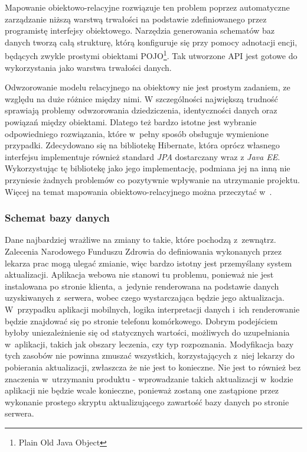\documentclass[11pt]{aghdpl}
\begin{document}
Mapowanie obiektowo-relacyjne rozwiązuje ten problem poprzez automatyczne zarządzanie niższą warstwą trwałości na podstawie zdefiniowanego przez programistę interfejsy obiektowego. Narzędzia generowania schematów baz danych tworzą całą strukturę, którą konfiguruje się przy pomocy adnotacji encji, będących zwykle prostymi obiektami POJO\footnote{Plain Old Java Object}. Tak utworzone API jest gotowe do wykorzystania jako warstwa trwałości danych.

Odwzorowanie modelu relacyjnego na obiektowy nie jest prostym zadaniem, ze względu na duże różnice między nimi. W szczególności największą trudność sprawiają problemy odwzorowania dziedziczenia, identyczności danych oraz powiązań między obiektami. Dlatego też bardzo istotne jest wybranie odpowiedniego rozwiązania, które w~pełny sposób obsługuje wymienione przypadki. Zdecydowano się na bibliotekę Hibernate, która oprócz własnego interfejsu implementuje również standard \emph{JPA} dostarczany wraz z \emph{Java EE}. Wykorzystując tę bibliotekę jako jego implementację, podmiana jej na inną nie przyniesie żadnych problemów co pozytywnie wpływanie na utrzymanie projektu. Więcej na temat mapowania obiektowo-relacyjnego można przeczytać w~\cite{HORM}.

\subsubsection{Schemat bazy danych}

Dane najbardziej wrażliwe na zmiany to takie, które pochodzą z~zewnątrz. Zalecenia Narodowego Funduszu Zdrowia do definiowania wykonanych przez lekarza prac mogą ulegać zmianie, więc bardzo istotny jest przemyślany system aktualizacji. Aplikacja webowa nie stanowi tu problemu, ponieważ nie jest instalowana po stronie klienta, a~jedynie renderowana na podstawie danych uzyskiwanych z~serwera, wobec czego wystarczająca będzie jego aktualizacja. W~przypadku aplikacji mobilnych, logika interpretacji danych i~ich renderowanie będzie znajdować się po stronie telefonu komórkowego. Dobrym podejściem byłoby uniezależnienie się od statycznych wartości, możliwych do uzupełniania w~aplikacji, takich jak obszary leczenia, czy typ rozpoznania. Modyfikacja bazy tych zasobów nie powinna zmuszać wszystkich, korzystających z~niej lekarzy do pobierania aktualizacji, zwłaszcza że nie jest to konieczne. Nie jest to również bez znaczenia w~utrzymaniu produktu - wprowadzanie takich aktualizacji w~kodzie aplikacji nie będzie wcale konieczne, ponieważ zostaną one zastąpione przez wykonanie prostego skryptu aktualizującego zawartość bazy danych po stronie serwera.
\end{document}

